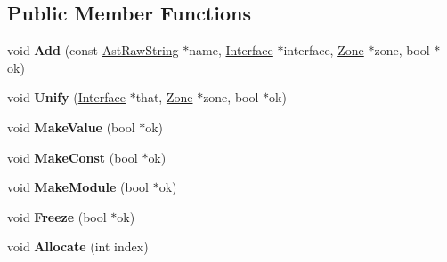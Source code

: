 \subsection*{Public Member Functions}
\begin{DoxyCompactItemize}
\item 
\hypertarget{classv8_1_1internal_1_1_interface_a177376a75bbb64bc2bc5812820bc0ca3}{}void {\bfseries Add} (const \hyperlink{classv8_1_1internal_1_1_ast_raw_string}{Ast\+Raw\+String} $\ast$name, \hyperlink{classv8_1_1internal_1_1_interface}{Interface} $\ast$interface, \hyperlink{classv8_1_1internal_1_1_zone}{Zone} $\ast$zone, bool $\ast$ok)\label{classv8_1_1internal_1_1_interface_a177376a75bbb64bc2bc5812820bc0ca3}

\item 
\hypertarget{classv8_1_1internal_1_1_interface_a5b5618b452e81199e9bc486ae34b5720}{}void {\bfseries Unify} (\hyperlink{classv8_1_1internal_1_1_interface}{Interface} $\ast$that, \hyperlink{classv8_1_1internal_1_1_zone}{Zone} $\ast$zone, bool $\ast$ok)\label{classv8_1_1internal_1_1_interface_a5b5618b452e81199e9bc486ae34b5720}

\item 
\hypertarget{classv8_1_1internal_1_1_interface_a11fec11b2d5619e10f1c7eacc47f2584}{}void {\bfseries Make\+Value} (bool $\ast$ok)\label{classv8_1_1internal_1_1_interface_a11fec11b2d5619e10f1c7eacc47f2584}

\item 
\hypertarget{classv8_1_1internal_1_1_interface_a5d90da8a149de1e1a57eda3000f9289b}{}void {\bfseries Make\+Const} (bool $\ast$ok)\label{classv8_1_1internal_1_1_interface_a5d90da8a149de1e1a57eda3000f9289b}

\item 
\hypertarget{classv8_1_1internal_1_1_interface_a6b57f6a20089ad65e18e5d4d4bc48411}{}void {\bfseries Make\+Module} (bool $\ast$ok)\label{classv8_1_1internal_1_1_interface_a6b57f6a20089ad65e18e5d4d4bc48411}

\item 
\hypertarget{classv8_1_1internal_1_1_interface_a21acac312056bf2af020f8cc7bae5270}{}void {\bfseries Freeze} (bool $\ast$ok)\label{classv8_1_1internal_1_1_interface_a21acac312056bf2af020f8cc7bae5270}

\item 
\hypertarget{classv8_1_1internal_1_1_interface_a0f8a11f5d35f869e56ee527d9c2144b5}{}void {\bfseries Allocate} (int index)\label{classv8_1_1internal_1_1_interface_a0f8a11f5d35f869e56ee527d9c2144b5}


\end{DoxyCompactItemize}
